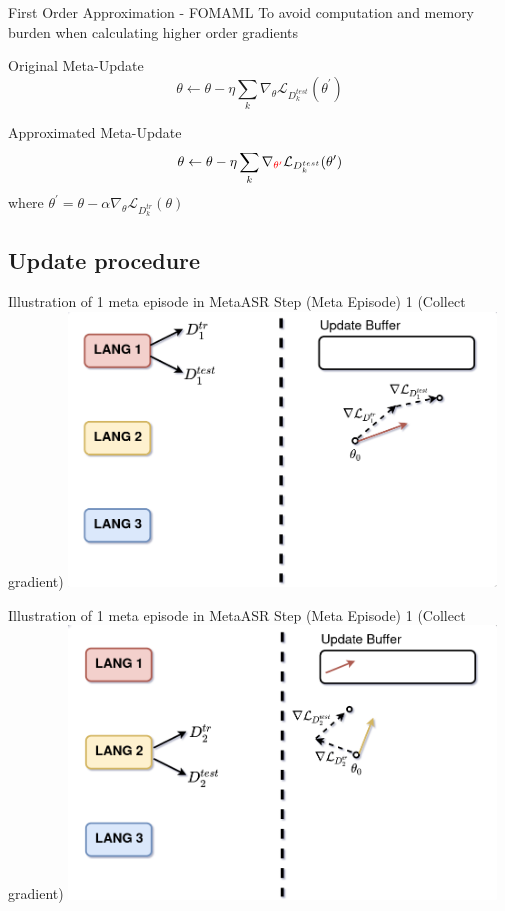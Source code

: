 \documentclass{beamer}
\begin{document}
\begin{frame}[t]{First Order Approximation - FOMAML}
  To avoid computation and memory burden when calculating higher order gradients
  \begin{block}{Original Meta-Update}
    \begin{equation*}
      \theta \leftarrow \theta - \eta \sum_k \nabla_\theta \mathcal{L}_{D^{test}_k}(\theta^\prime)
    \end{equation*}
  \end{block}
  \begin{block}{Approximated Meta-Update}
    \begin{equation*}
      \theta \leftarrow \theta - \eta \sum_k \nabla_{\textcolor{red}{\theta^\prime}} \mathcal{L}_{D^{test}_k}(\theta^\prime)
    \end{equation*}
    \center where $\theta^\prime = \theta - \alpha \nabla_\theta \mathcal{L}_{D^{tr}_k} (\theta)$
  \end{block}
\end{frame}

\subsection{Update procedure}
\begin{frame}[t]{Illustration of 1 meta episode in MetaASR}
  Step (Meta Episode) 1 (Collect gradient)
  \center \includegraphics[width=0.85\textwidth]{fig/meta_step1.png}
\end{frame}

\begin{frame}[t]{Illustration of 1 meta episode in MetaASR}
  Step (Meta Episode) 1 (Collect gradient)
  \center \includegraphics[width=0.85\textwidth]{fig/meta_step2.png}
\end{frame}
\end{document}
